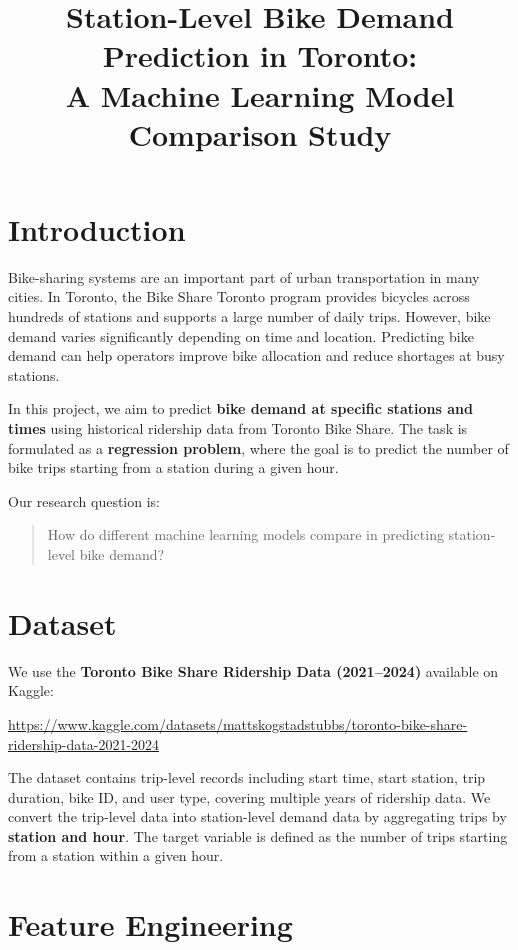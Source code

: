 \documentclass[11pt]{article}
\title{Station-Level Bike Demand Prediction in Toronto: \\ 
A Machine Learning Model Comparison Study}
\author{}
\date{}
\begin{document}
\maketitle


\section{Introduction}

Bike-sharing systems are an important part of urban transportation in many cities.
In Toronto, the Bike Share Toronto program provides bicycles across hundreds of
stations and supports a large number of daily trips. However, bike demand varies
significantly depending on time and location. Predicting bike demand can help
operators improve bike allocation and reduce shortages at busy stations.

In this project, we aim to predict \textbf{bike demand at specific stations and
    times} using historical ridership data from Toronto Bike Share. The task is
formulated as a \textbf{regression problem}, where the goal is to predict the
number of bike trips starting from a station during a given hour.

Our research question is:

\begin{quote}
    How do different machine learning models compare in predicting station-level bike demand?
\end{quote}


\section{Dataset}

We use the \textbf{Toronto Bike Share Ridership Data (2021–2024)} available on Kaggle:

\begin{center}
    \url{https://www.kaggle.com/datasets/mattskogstadstubbs/toronto-bike-share-ridership-data-2021-2024}
\end{center}

The dataset contains trip-level records including start time, start station, trip
duration, bike ID, and user type, covering multiple years of ridership data. We convert the trip-level data into station-level
demand data by aggregating trips by \textbf{station and hour}. The target variable
is defined as the number of trips starting from a station within a given hour.

\section{Feature Engineering}
\end{document}
